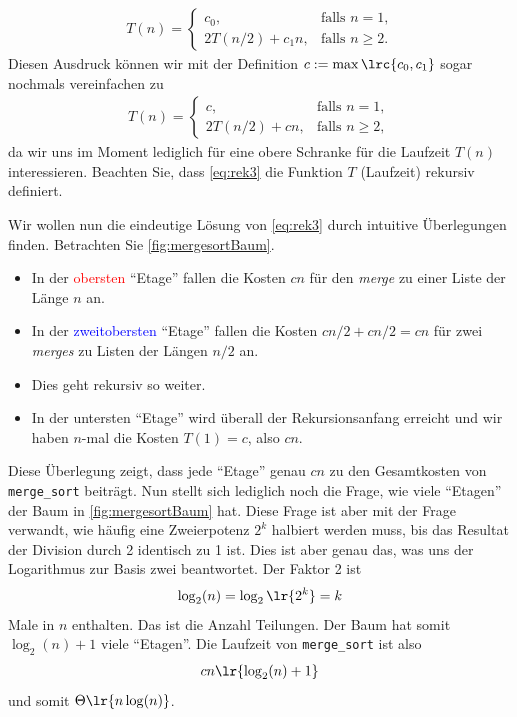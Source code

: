 \begin{align}\label{eq:rek2}
	T(n) =
	\begin{cases}
		c_0,            & \text{falls $n = 1$,}   \\
		2T(n/2) + c_1n, & \text{falls $n\geq 2$}.
	\end{cases}
\end{align}
Diesen Ausdruck können wir mit der Definition $c := \max\lrc{c_0,c_1}$ sogar nochmals vereinfachen zu
\begin{align}\label{eq:rek3}
	T(n) =
	\begin{cases}
		c,            & \text{falls $n = 1$,}   \\
		2T(n/2) + cn, & \text{falls $n\geq 2$},
	\end{cases}
\end{align}
da wir uns im Moment lediglich für eine obere Schranke für die Laufzeit $T(n)$ interessieren. Beachten Sie, dass \cref{eq:rek3} die Funktion $T$ (Laufzeit) rekursiv definiert.

Wir wollen nun die eindeutige Lösung von \cref{eq:rek3} durch intuitive Überlegungen finden. Betrachten Sie \cref{fig:mergesortBaum}.
\begin{itemize}
	\item In der \textcolor{Red}{obersten} \enquote{Etage} fallen die Kosten $cn$ für den \emph{merge} zu einer Liste der Länge $n$ an.
	\item In der \textcolor{Blue}{zweitobersten} \enquote{Etage} fallen die Kosten $cn/2 + cn/2 = cn$ für zwei \emph{merges} zu Listen der Längen $n/2$ an.
	\item Dies geht rekursiv so weiter.
	\item In der untersten \enquote{Etage} wird überall der Rekursionsanfang erreicht und wir haben $n$-mal die Kosten $T(1) = c$, also $cn$.
\end{itemize}
Diese Überlegung zeigt, dass jede \enquote{Etage} genau $cn$ zu den Gesamtkosten von \lstinline{merge_sort} beiträgt. Nun stellt sich lediglich noch die Frage, wie viele \enquote{Etagen} der Baum in \cref{fig:mergesortBaum} hat. Diese Frage ist aber mit der Frage verwandt, wie häufig eine Zweierpotenz $2^k$ halbiert werden muss, bis das Resultat der Division durch 2 identisch zu 1 ist. Dies ist aber genau das, was uns der Logarithmus zur Basis zwei beantwortet. Der Faktor 2 ist
\begin{align*}
	\log_2(n) = \log_2\lr{2^k} = k
\end{align*}
Male in $n$ enthalten. Das ist die Anzahl Teilungen. Der Baum hat somit $\log_2(n) + 1$ viele \enquote{Etagen}. Die Laufzeit von \lstinline{merge_sort} ist also
\begin{align*}
	cn\lr{\log_2(n) + 1}
\end{align*}
und somit $\Theta\lr{n\log(n)}$.

